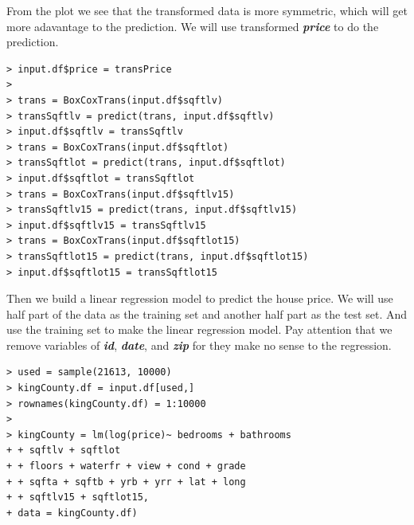 \documentclass{article}%
\begin{document}
From the plot we see that the transformed data is more symmetric, which will get more adavantage to the prediction. We will use transformed  \emph{\textbf{price}} to do the prediction.\\
\begin{verbatim}
> input.df$price = transPrice
>
> trans = BoxCoxTrans(input.df$sqftlv)
> transSqftlv = predict(trans, input.df$sqftlv)
> input.df$sqftlv = transSqftlv
> trans = BoxCoxTrans(input.df$sqftlot)
> transSqftlot = predict(trans, input.df$sqftlot)
> input.df$sqftlot = transSqftlot
> trans = BoxCoxTrans(input.df$sqftlv15)
> transSqftlv15 = predict(trans, input.df$sqftlv15)
> input.df$sqftlv15 = transSqftlv15
> trans = BoxCoxTrans(input.df$sqftlot15)
> transSqftlot15 = predict(trans, input.df$sqftlot15)
> input.df$sqftlot15 = transSqftlot15
\end{verbatim}

Then we build a linear regression model to predict the house price. We will use half part of the data as the training set and another half part as the test set. And use the training set to make the linear regression model. Pay attention that we remove variables of  \emph{\textbf{id}},  \emph{\textbf{date}},  and \emph{\textbf{zip}} for they make no sense to the regression.
\begin{verbatim}
> used = sample(21613, 10000)
> kingCounty.df = input.df[used,]
> rownames(kingCounty.df) = 1:10000
>
> kingCounty = lm(log(price)~ bedrooms + bathrooms
+ + sqftlv + sqftlot
+ + floors + waterfr + view + cond + grade
+ + sqfta + sqftb + yrb + yrr + lat + long
+ + sqftlv15 + sqftlot15,
+ data = kingCounty.df)
\end{verbatim}
\end{document}
